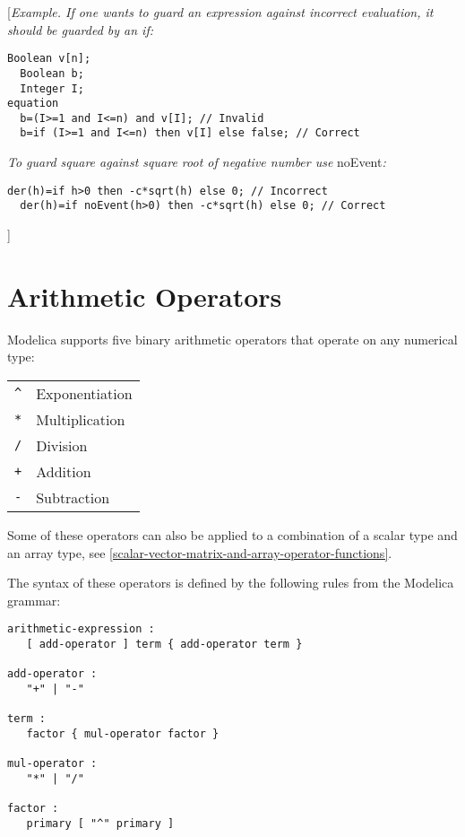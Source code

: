 {[}\emph{Example. If one wants to guard an expression against incorrect
evaluation, it should be guarded by an if:}

\begin{lstlisting}[language=modelica]
  Boolean v[n];
  Boolean b;
  Integer I;
equation
  b=(I>=1 and I<=n) and v[I]; // Invalid
  b=if (I>=1 and I<=n) then v[I] else false; // Correct
\end{lstlisting}

\emph{To guard square against square root of negative number use}
noEvent\emph{:}
\begin{lstlisting}[language=modelica]
  der(h)=if h>0 then -c*sqrt(h) else 0; // Incorrect
  der(h)=if noEvent(h>0) then -c*sqrt(h) else 0; // Correct
\end{lstlisting}
{]}

\section{Arithmetic Operators}

Modelica supports five binary arithmetic operators that operate on any
numerical type:

\begin{longtable}[c]{ll}
\lstinline!^! & Exponentiation\\
\lstinline!*! & Multiplication\\
\lstinline!/! & Division\\
\lstinline!+! & Addition\\
\lstinline!-! & Subtraction\\
\end{longtable}

Some of these operators can also be applied to a combination of a scalar
type and an array type, see \autoref{scalar-vector-matrix-and-array-operator-functions}.

The syntax of these operators is defined by the following rules from the
Modelica grammar:

\begin{lstlisting}[language=grammar]
arithmetic-expression :
   [ add-operator ] term { add-operator term }

add-operator :
   "+" | "-"

term :
   factor { mul-operator factor }

mul-operator :
   "*" | "/"

factor :
   primary [ "^" primary ]
\end{lstlisting}


